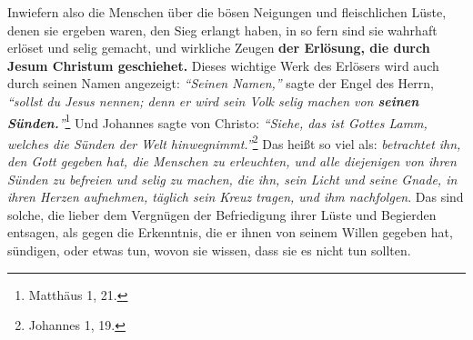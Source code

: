Inwiefern also die Menschen über die bösen Neigungen und fleischlichen Lüste,
denen sie ergeben waren, den Sieg erlangt haben, in so fern sind sie wahrhaft
erlöset und selig gemacht, und wirkliche Zeugen
\label{ref:01_10_jesus_der_erloeser}
\textbf{der Erlösung, die durch
Jesum Christum geschiehet.}
Dieses wichtige Werk des Erlösers wird auch durch seinen Namen angezeigt:
\textit{"`Seinen Namen,"'} sagte der Engel des Herrn, \textit{"`sollst du Jesus
nennen; denn er wird sein Volk selig machen von \textbf{seinen
Sünden.}"'}\footnote{Matthäus 1, 21.}
Und Johannes sagte von Christo:
\textit{"`Siehe, das ist Gottes Lamm, welches die Sünden der Welt hinwegnimmt."'}\footnote{Johannes 1, 19.}
Das heißt so viel als:
\textit{betrachtet ihn, den Gott gegeben hat, die Menschen zu erleuchten, und
alle diejenigen von ihren Sünden zu befreien und selig zu machen, die ihn, sein
Licht und seine Gnade, in ihren Herzen aufnehmen, täglich sein Kreuz tragen, und
ihm nachfolgen}.
Das sind solche, die lieber dem Vergnügen der Befriedigung ihrer Lüste und
Begierden entsagen, als gegen die Erkenntnis, die er ihnen von seinem Willen
gegeben hat, sündigen, oder etwas tun, wovon sie wissen, dass sie es nicht tun
sollten.






